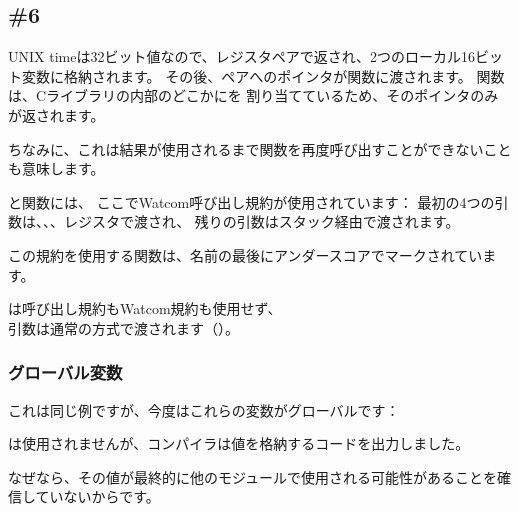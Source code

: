 \subsection{\Example{} \#6}






UNIX timeは32ビット値なので、レジスタペアで返され、2つのローカル16ビット変数に格納されます。
その後、ペアへのポインタが関数に渡されます。
関数は、Cライブラリの内部のどこかにを
割り当てているため、そのポインタのみが返されます。

ちなみに、これは結果が使用されるまで関数を再度呼び出すことができないことも意味します。

と関数には、
ここでWatcom呼び出し規約が使用されています：
最初の4つの引数は、、、レジスタで渡され、
残りの引数はスタック経由で渡されます。

この規約を使用する関数は、名前の最後にアンダースコアでマークされています。

は呼び出し規約もWatcom規約も使用せず、\\ %
引数は通常の方式で渡されます（）。

\subsubsection{グローバル変数}

これは同じ例ですが、今度はこれらの変数がグローバルです：





は使用されませんが、コンパイラは値を格納するコードを出力しました。

なぜなら、その値が最終的に他のモジュールで使用される可能性があることを確信していないからです。